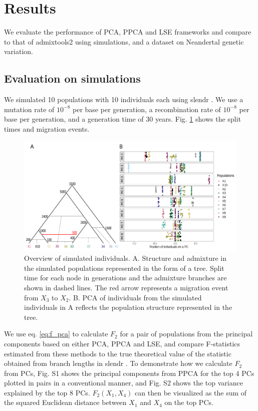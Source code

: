\documentclass[12pt, letterpaper]{article}
\begin{document}
\section{Results}
We evaluate the performance of PCA, PPCA and LSE frameworks and compare to that of admixtools2 \cite{maier_limits_2022} using simulations, and a dataset on Neandertal genetic variation. 

\subsection{Evaluation on simulations}
We simulated 10 populations with 10 individuals each using slendr \cite{petr_slendr_2022}. We use a mutation rate of $10^{-8}$ per base per generation, a recombination rate of $10^{-8}$ per base per generation, and a generation time of 30 years. Fig. \ref{fig2:sim} shows the split times and migration events. 

\begin{figure}[ht!]
    \includegraphics[width=16.5cm]{ppt/sim_all.png}
    \centering
    \caption{Overview of simulated individuals. A. Structure and admixture in the simulated populations represented in the form of a tree. Split time for each node in generations and the admixture branches are shown in dashed lines. The red arrow represents a migration event from $X_3$ to $X_2$. B. PCA of individuals from the simulated individuals in A reflects the population structure represented in the tree.}
    \label{fig2:sim}
\end{figure}

We use eq. \ref{eq:f_pca} to calculate $F_2$ for a pair of populations from the principal components based on either  PCA, PPCA and LSE, and compare F-statistics estimated from these methods to the true theoretical value of the statistic obtained from branch lengths in slendr \cite{petr_slendr_2022}. To demonstrate how we calculate $F_2$ from PCs, Fig. S1 shows the principal components from PPCA for the top 4 PCs plotted in pairs in a conventional manner, and Fig. S2 shows the top variance explained by the top 8 PCs. $F_2(X_1, X_4)$ can then be visualized as the sum of the squared Euclidean distance between $X_1$ and $X_4$ on the top PCs.
\end{document}
